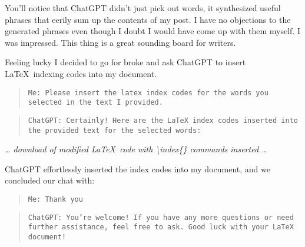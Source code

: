 You'll notice that ChatGPT didn't just pick out words, it synthesized
useful phrases that eerily sum up the contents of my post. I have no
objections to the generated phrases even though I doubt I would have
come up with them myself. I was impressed. This thing is a great
sounding board for writers.

Feeling lucky I decided to go for broke and ask ChatGPT to insert \LaTeX\
indexing codes into my document.

\begin{quote}
\texttt{Me: Please insert the latex index codes for the words you
selected in the text I provided.}
\end{quote}

\begin{quote}
\texttt{ChatGPT: Certainly! Here are the LaTeX index codes inserted
into the provided text for the selected words:}
\end{quote}

\emph{\ldots{} download of modified \LaTeX\ code with
\textbackslash index\{\} commands inserted \ldots{}}

ChatGPT effortlessly inserted the index codes into my document, and we
concluded our chat with:

\begin{quote}
\texttt{Me: Thank you}
\end{quote}

\begin{quote}
\texttt{ChatGPT: You're welcome! If you have any more questions or need
further assistance, feel free to ask. Good luck with your LaTeX
document!}
\end{quote}

%



%
 

